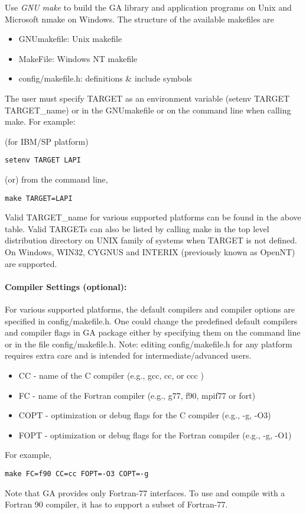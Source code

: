 Use\emph{ GNU make} to build the GA library and application programs
on Unix and Microsoft nmake on Windows. The structure of the available
makefiles are
\begin{itemize}
\item GNUmakefile: Unix makefile 
\item MakeFile: Windows NT makefile 
\item config/makefile.h: definitions \& include symbols
\end{itemize}
The user must specify TARGET as an environment variable (setenv TARGET
TARGET\_name) or in the GNUmakefile or on the command line when calling
make. For example: 

(for IBM/SP platform)
\begin{verbatim}
setenv TARGET LAPI
\end{verbatim}
(or) from the command line, 
\begin{verbatim}
make TARGET=LAPI
\end{verbatim}
Valid TARGET\_name for various supported platforms can be found in
the above table. Valid TARGETs can also be listed by calling make
in the top level distribution directory on UNIX family of systems
when TARGET is not defined. On Windows, WIN32, CYGNUS and INTERIX
(previously known as OpenNT) are supported. 


\paragraph{Compiler Settings (optional): }

For various supported platforms, the default compilers and compiler
options are specified in config/makefile.h. One could change the predefined
default compilers and compiler flags in GA package either by specifying
them on the command line or in the file config/makefile.h. Note: editing
config/makefile.h for any platform requires extra care and is intended
for intermediate/advanced users.
\begin{itemize}
\item CC - name of the C compiler (e.g., gcc, cc, or ccc ) 
\item FC - name of the Fortran compiler (e.g., g77, f90, mpif77 or fort) 
\item COPT - optimization or debug flags for the C compiler (e.g., -g, -O3) 
\item FOPT - optimization or debug flags for the Fortran compiler (e.g.,
-g, -O1)
\end{itemize}
For example,
\begin{verbatim}
make FC=f90 CC=cc FOPT=-O3 COPT=-g
\end{verbatim}
Note that GA provides only Fortran-77 interfaces. To use and compile
with a Fortran 90 compiler, it has to support a subset of Fortran-77. 


